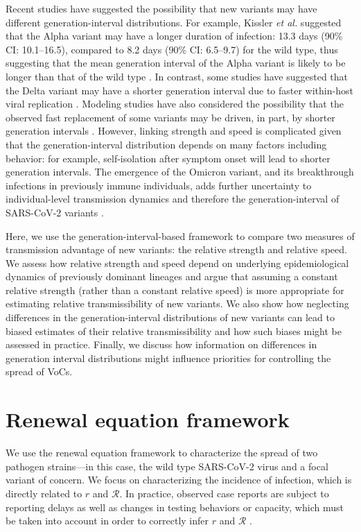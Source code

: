 \documentclass[12pt]{article}
\newcommand{\RR}{\ensuremath{{\mathcal R}}\xspace}
\begin{document}
Recent studies have suggested the possibility that new variants may have different generation-interval distributions.
For example, Kissler \textit{et al.} \citep{kissler2021densely} suggested that the Alpha variant may have a longer duration of infection: 13.3 days (90\% CI: 10.1--16.5), compared to 8.2 days (90\% CI: 6.5--9.7) for the wild type, thus suggesting that the mean generation interval of the Alpha variant is likely to be longer than that of the wild type \citep{lloyd2001realistic,wearing2005appropriate,roberts2007model}.
In contrast, some studies have suggested that the Delta variant may have a shorter generation interval due to faster within-host viral replication \citep{li2021viral,zhang2021transmission}.
Modeling studies have also considered the possibility that the observed fast replacement of some variants may be driven, in part, by shorter generation intervals \citep{davies2021estimated,volz2021transmission}.
However, linking strength and speed is complicated given that the generation-interval distribution depends on many factors including behavior:
for example, self-isolation after symptom onset will lead to shorter generation intervals.
The emergence of the Omicron variant, and its breakthrough infections in previously immune individuals, adds further uncertainty to individual-level transmission dynamics and therefore the generation-interval of SARS-CoV-2 variants \citep{pulliam2021increased}.

Here, we use the generation-interval-based framework to compare two measures of transmission advantage of new variants: the relative strength and relative speed.
We assess how relative strength and speed depend on underlying epidemiological dynamics of previously dominant lineages and argue that assuming a constant relative strength (rather than a constant relative speed) is more appropriate for estimating relative transmissibility of new variants.
We also show how neglecting differences in the generation-interval distributions of new variants can lead to biased estimates of their relative transmissibility and how such biases might be assessed in practice.
Finally, we discuss how information on differences in generation interval distributions might influence priorities for controlling the spread of VoCs.

\section{Renewal equation framework}

We use the renewal equation framework to characterize the spread of two pathogen strains---in this case, the wild type SARS-CoV-2 virus and a focal variant of concern.
We focus on characterizing the incidence of infection, which is directly related to $r$ and $\RR$.
In practice, observed case reports are subject to reporting delays as well as changes in testing behaviors or capacity, which must be taken into account in order to correctly infer $r$ and $\RR$ \citep{goldstein2009reconstructing,gostic2020practical}.
\end{document}
